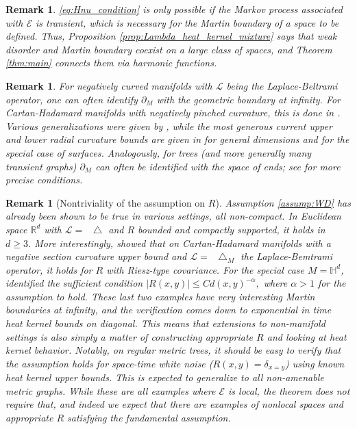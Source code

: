 \documentclass{article}
\newtheorem{remark}[theorem]{Remark}
\numberwithin{theorem}{section}
\def\RR{\mathbb{R}} %
\def\HH{\mathbb{H}} %
\newcommand*\Laplace{\mathop{}\!\mathbin\bigtriangleup}%
\begin{document}
\begin{remark}
\eqref{eq:Hnu_condition} is only possible if the Markov process associated with $\mathcal{E}$ is transient, which is necessary for the Martin boundary of a space to be defined. Thus, Proposition \ref{prop:Lambda_heat_kernel_mixture} says that weak disorder and Martin boundary coexist on a large class of spaces, and Theorem \ref{thm:main} connects them via harmonic functions.
\end{remark}

\begin{remark}
For negatively curved manifolds with $\mathcal{L}$ being the Laplace-Beltrami operator, one can often identify $\partial_M$ with the geometric boundary at infinity. 
For Cartan-Hadamard manifolds with negatively pinched curvature, this is done in \cite{AndersonSchoen85}. Various generalizations were given by \cite{Ancona87,Kifer}, while the most generous current upper and lower radial curvature bounds are given in \cite{Ji} for general dimensions and \cite{Neel} for the special case of surfaces. 
Analogously, for trees (and more generally many transient graphs) $\partial_M$ can often be identified with the space of ends; see \cite{Hong2024,PicardelloWoess1987} for more precise conditions.
\end{remark}

\begin{remark}[Nontriviality of the assumption on $R$]
    Assumption \eqref{assump:WD} has already been shown to be true in various settings, all non-compact. In Euclidean space $\RR^d$ with $\mathcal{L}=\Laplace$ and $R$ bounded and compactly supported, it holds in $d\ge 3$. More interestingly, \cite[Lemma 8]{BCO24} showed that on Cartan-Hadamard manifolds with a negative section curvature upper bound and $\mathcal{L}=\Laplace_M$ the Laplace-Bemtrami operator, it holds for $R$ with Riesz-type covariance. For the special case $M=\HH^d$, \cite[Lemma 2.4]{geng-ouyang} identified the sufficient condition $|R(x,y)|\leq Cd(x,y)^{-\alpha},$ where $\alpha>1$ for the assumption to hold. These last two examples have very interesting Martin boundaries at infinity, and the verification comes down to exponential in time heat kernel bounds on diagonal. This means that extensions to non-manifold settings is also simply a matter of constructing appropriate $R$ and looking at heat kernel behavior. Notably, on regular metric trees, it should be easy to verify that the assumption holds for space-time white noise (\(R(x,y)=\delta_{x=y}\)) using known heat kernel upper bounds\cite{Croydon2008,AthreyaLoehrWinter2011,Hong2024}. This is expected to generalize to all non-amenable metric graphs. While these are all examples where $\mathcal{E}$ is local, the theorem does not require that, and indeed we expect that there are examples of nonlocal spaces and appropriate $R$ satisfying the fundamental assumption.
\end{remark}
\end{document}
